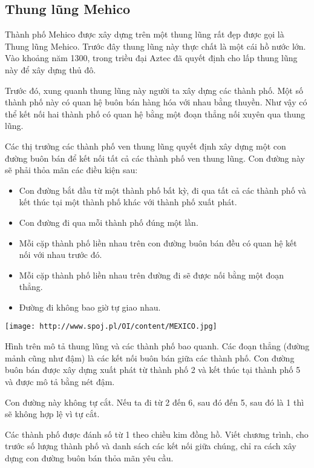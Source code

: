 \subsection{   Thung lũng Mehico  }

   Thành phố Mehico được xây dựng trên một thung lũng rất đẹp được gọi là Thung lũng Mehico. Trước đây thung lũng này thực chất là một cái hồ nước lớn. Vào khoảng năm 1300, trong triều đại Aztec đã quyết định cho lấp thung lũng này để xây dựng thủ đô.  

   Trước đó, xung quanh thung lũng này người ta xây dựng các thành phố. Một số thành phố này có quan hệ buôn bán hàng hóa với nhau bằng thuyền. Như vậy có thể kết nối hai thành phố có quan hệ bằng một đoạn thẳng nối xuyên qua thung lũng.  

   Các thị trưởng các thành phố ven thung lũng quyết định xây dựng một con đường buôn bán để kết nối tất cả các thành phố ven thung lũng. Con đường này sẽ phải thỏa mãn các điều kiện sau:  
\begin{itemize}
	\item     Con đường bắt đầu từ một thành phố bất kỳ, đi qua tất cả các thành phố và kết thúc tại một thành phố khác với thành phố xuất phát.   
	\item     Con đường đi qua mỗi thành phố đúng một lần.   
	\item     Mỗi cặp thành phố liền nhau trên con đường buôn bán đều có quan hệ kết nối với nhau trước đó.   
	\item     Mỗi cặp thành phố liền nhau trên đường đi sẽ được nối bằng một đoạn thẳng.   
	\item     Đường đi không bao giờ tự giao nhau.   
\end{itemize}


\texttt{[image: http://www.spoj.pl/OI/content/MEXICO.jpg]}

   Hình trên mô tả thung lũng và các thành phố bao quanh. Các đoạn thẳng (đường mảnh cũng như đậm) là các kết nối buôn bán giữa các thành phố. Con đường buôn bán được xây dựng xuất phát từ thành phố 2 và kết thúc tại thành phố 5 và được mô tả bằng nét đậm.  

   Con đường này không tự cắt. Nếu ta đi từ 2 đến 6, sau đó đến 5, sau đó là 1 thì sẽ không hợp lệ vì tự cắt.  

   Các thành phố được đánh số từ 1 theo chiều kim đồng hồ.
Viết chương trình, cho trước số lượng thành phố và danh sách các kết nối giữa chúng, chỉ ra cách xây dựng con đường buôn bán thỏa mãn yêu cầu.